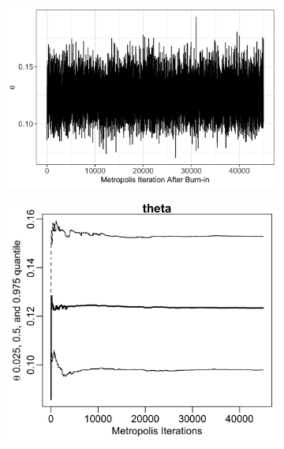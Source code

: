 \documentclass{uwstat572}
\begin{document}
\begin{figure}[H]
	\centering
	\begin{subfigure}[b]{\textwidth}
		\includegraphics[width=\textwidth]{figures/theta_mcmc_chain.png}
		\caption{}
	\label{fig:chain_theta}
	\end{subfigure}
	\qquad
	\begin{subfigure}[b]{0.49\textwidth}
		\includegraphics[width=\textwidth]{figures/mcmc_cum_quant_plot_theta.png}
		\caption{}
		\label{fig:quant_theta}
	\end{subfigure}
	\hfill
	\begin{subfigure}[b]{0.49\textwidth}

\end{subfigure}
\end{figure}
\end{document}
